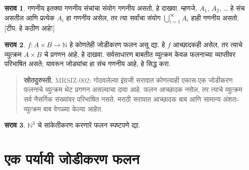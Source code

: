 \documentclass[11pt,a4paper,openany]{book}
\theoremstyle{definition}
\newtheorem{prob}{सराव}[chapter]
\newcommand{\Nat}{\mathbb{N}}
\begin{document}
\begin{prob}
गणनीय इतक्या गणनीय संचांचा संयोग गणनीय असतो,
हे दाखवा. म्हणजे, $A_1$, $A_2$, \dots{} हे संच असतील आणि प्रत्येक
$A_i$ हा गणनीय असेल, तर त्या सर्वांचा संयोग
$\bigcup_{i=1}^\infty A_i$ हाही गणनीय असतो. [टीप: हे कठीण आहे!]
\end{prob}

\begin{prob}
$f \colon A \times B \to \Nat$ हे कोणतेही जोडीकरण फलन असू द्या.
हे $f$ आच्छादकही असेल, तर त्याचे व्युत्क्रम $A \times B$ चे प्रगणन
आहे, हे दाखवा. सर्वसाधारण बाबतीत व्युत्क्रम केवळ फलनाच्या व्याप्तीवर
परिभाषित असते; यावरून जोड्यांचा हा संच गणनीय आहे, हे सिद्ध करा.
\begin{quote}\small\textbf{स्रोतदुरुस्ती.} MRSIZ-002: गोठवलेल्या इंग्रजी सरावात कोणत्याही एकास-एक जोडीकरण फलनाचे व्युत्क्रम थेट प्रगणन असल्याचा दावा आहे. फलन आच्छादक नसेल, तर त्याचे व्युत्क्रम सर्व नैसर्गिक संख्यांवर परिभाषित नसते. मराठी सरावात आच्छादक बाब आणि सामान्य अंशतः-व्युत्क्रम बाब वेगळ्या केल्या आहेत.\end{quote}
\end{prob}

\begin{prob}
$\Nat^3$ चे सांकेतीकरण करणारे फलन स्पष्टपणे द्या.
\end{prob}









\section{एक पर्यायी जोडीकरण फलन}\label{sfr:siz:pai-alt:sec}
\end{document}
